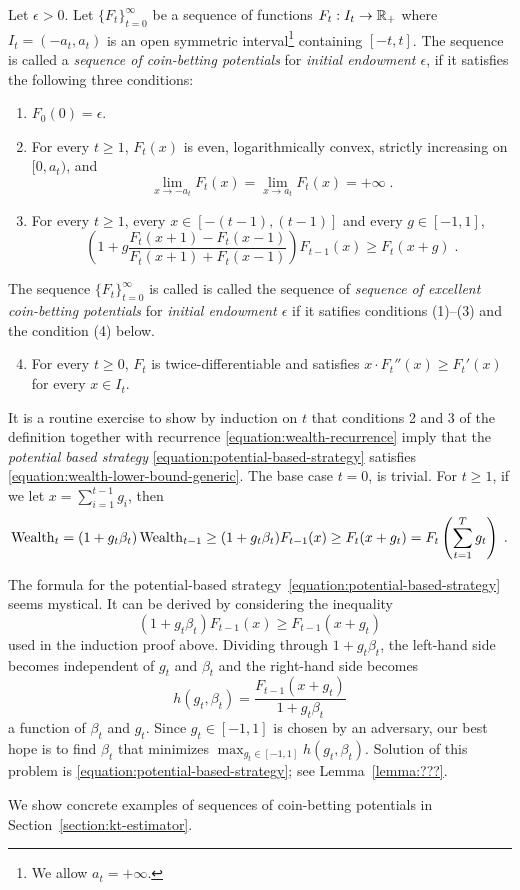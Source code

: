 \begin{definition}
\label{definition:potential}
Let $\epsilon > 0$. Let $\{F_t\}_{t=0}^\infty$ be a sequence of functions
$F_t:I_t  \to \mathbb{R}_+$ where $I_t = (-a_t, a_t)$ is an open symmetric interval\footnote{We allow $a_t = +\infty$.} containing
$[-t,t]$.  The sequence is called a \emph{sequence of coin-betting potentials}
for \emph{initial endowment $\epsilon$}, if it satisfies the following three conditions:
\begin{enumerate}[(1)]
\item $F_0(0) = \epsilon$.

\item For every $t \ge 1$, $F_t(x)$ is even, logarithmically convex, strictly increasing on $[0,a_t)$, and
\begin{equation}
\label{equation:potential-limit-assumption}
\lim_{x \to -a_t} F_t(x) = \lim_{x \to a_t} F_t(x) = +\infty \; .
\end{equation}

\item For every $t \ge 1$, every $x \in [-(t-1), (t-1)]$ and every $g \in [-1,1]$,
$$
\left(1 + g \frac{F_t(x + 1) - F_t(x - 1)}{F_t(x + 1) + F_t(x - 1)} \right) F_{t-1}(x) \ge F_t(x+g) \; .
$$
\end{enumerate}
The sequence $\{F_t\}_{t=0}^\infty$  is called is called the sequence of
\emph{sequence of excellent coin-betting potentials} for \emph{initial endowment
$\epsilon$} if it satifies conditions (1)--(3) and the condition (4) below.
\begin{enumerate}[(1)]
\setcounter{enumi}{3}
\item For every $t \ge 0$, $F_t$ is twice-differentiable and
satisfies $x \cdot F_t''(x) \ge F_t'(x)$ for every $x \in I_t$.
\end{enumerate}
\end{definition}

It is a routine exercise to show by induction on $t$ that conditions 2 and 3
of the definition together with recurrence \eqref{equation:wealth-recurrence}
imply that the \emph{potential based strategy}
\eqref{equation:potential-based-strategy} satisfies
\eqref{equation:wealth-lower-bound-generic}. The base case $t=0$, is trivial.
For $t \ge 1$, if we let $x = \sum_{i=1}^{t-1} g_i$, then
$$
\operatorname{Wealth}_t
= (1+g_t \beta_t) \operatorname{Wealth}_{t-1}
\ge (1 + g_t \beta_t) F_{t-1}(x)
\ge F_t(x + g_t)
= F_t \left( \sum_{t=1}^T g_t \right) \; .
$$

The formula for the potential-based
strategy~\eqref{equation:potential-based-strategy} seems mystical. It
can be derived by considering the inequality
$$
(1+g_t\beta_t) F_{t-1}(x) \ge F_{t-1}(x + g_t)
$$
used in the induction proof above. Dividing through $1+g_t\beta_t$, the left-hand
side becomes independent of $g_t$ and $\beta_t$ and the right-hand side becomes
$$
h(g_t, \beta_t) = \frac{F_{t-1}(x + g_t)}{1 + g_t\beta_t}
$$
a function of $\beta_t$ and $g_t$. Since $g_t \in [-1,1]$ is chosen by an
adversary, our best hope is to find $\beta_t$ that minimizes $\max_{g_t \in
[-1,1]} h(g_t,\beta_t)$. Solution of this problem is \eqref{equation:potential-based-strategy};
see Lemma~\ref{lemma:???}.

We show concrete examples of sequences of coin-betting potentials in
Section~\ref{section:kt-estimator}.
